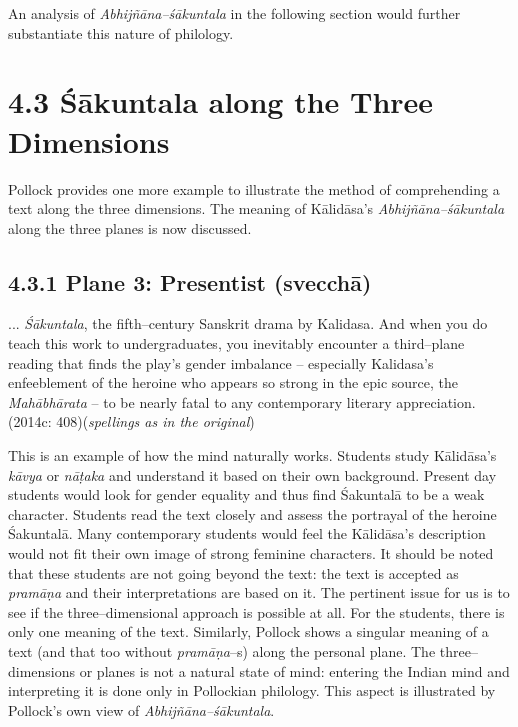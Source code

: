 An analysis of \textit{Abhijñāna–śākuntala} in the following section would further substantiate this nature of philology.

\newpage

\section*{4.3 Śākuntala along the Three Dimensions}

Pollock provides one more example to illustrate the method of comprehending a text along the three dimensions. The meaning of Kālidāsa’s \textit{Abhijñāna–śākuntala }along the three planes is now discussed.

\subsection*{4.3.1 Plane 3: Presentist (svecchā)}

\begin{myquote}
... \textit{Śākuntala}, the fifth–century Sanskrit drama by Kalidasa. And when you do teach this work to undergraduates, you inevitably encounter a third–plane reading that finds the play’s gender imbalance – especially Kalidasa’s enfeeblement of the heroine who appears so strong in the epic source, the \textit{Mahābhārata} – to be nearly fatal to any contemporary literary appreciation. (2014c: 408)(\textit{spellings as in the original})
\end{myquote}

This is an example of how the mind naturally works. Students study Kālidāsa’s \textit{kāvya} or \textit{nāṭaka} and understand it based on their own background. Present day students would look for gender equality and thus find Śakuntalā to be a weak character. Students read the text closely and assess the portrayal of the heroine Śakuntalā. Many contemporary students would feel the Kālidāsa’s description would not fit their own image of strong feminine characters. It should be noted that these students are not going beyond the text: the text is accepted as \textit{pramāṇa} and their interpretations are based on it. The pertinent issue for us is to see if the three–dimensional approach is possible at all. For the students, there is only one meaning of the text. Similarly, Pollock shows a singular meaning of a text (and that too without \textit{pramāṇa}–s) along the personal plane. The three–dimensions or planes is not a natural state of mind: entering the Indian mind and interpreting it is done only in Pollockian philology. This aspect is illustrated by Pollock’s own view of \textit{Abhijñāna–śākuntala}.

